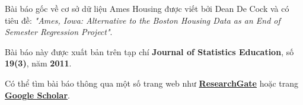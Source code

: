 



Bài báo gốc về cơ sở dữ liệu Ames Housing được viết bởi Dean De Cock và có tiêu đề:  
\textit{"Ames, Iowa: Alternative to the Boston Housing Data as an End of Semester Regression Project"}.  

Bài báo này được xuất bản trên tạp chí \textbf{Journal of Statistics Education}, số \textbf{19(3)}, năm \textbf{2011}.  

Có thể tìm bài báo thông qua một số trang web như  
\href{https://www.researchgate.net/publication/369437029_Price_Prediction_of_Ames_Housing_Through_Advanced_Regression_Techniques}{\textbf{ResearchGate}}  
hoặc trang  
\href{https://www.tandfonline.com/doi/abs/10.1080/10691898.2011.11889627}{\textbf{Google Scholar}}.


